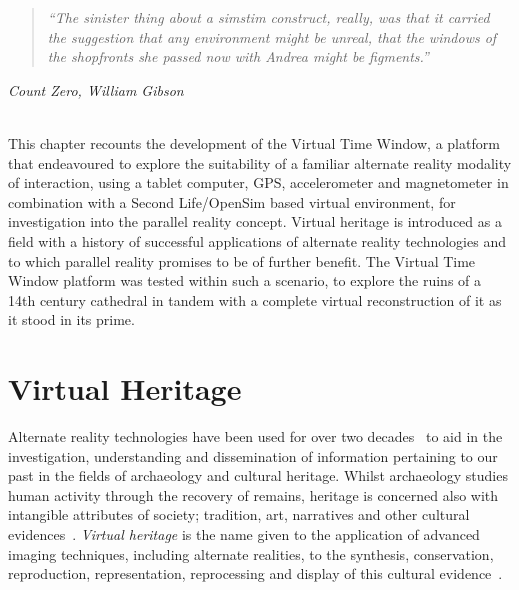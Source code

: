 \begin{quote}
	\textit{``The sinister thing about a simstim construct, really, was that it carried the suggestion that any environment might be unreal, that the windows of the shopfronts she passed now with Andrea might be figments.''}
\end{quote}
\hfill \textit{Count Zero, William Gibson}
\\
\\


\label{chapter-vtw}

This chapter recounts the development of the Virtual Time Window, a platform that endeavoured to explore the suitability of a familiar alternate reality modality of interaction, using a tablet computer, GPS, accelerometer and magnetometer in combination with a Second Life/OpenSim based virtual environment, for investigation into the parallel reality concept. Virtual heritage is introduced as a field with a history of successful applications of alternate reality technologies and to which parallel reality promises to be of further benefit. The Virtual Time Window platform was tested within such a scenario, to explore the ruins of a 14th century cathedral in tandem with a complete virtual reconstruction of it as it stood in its prime.


\section{Virtual Heritage}

Alternate reality technologies have been used for over two decades~\cite{Roussou2002} to aid in the investigation, understanding and dissemination of information pertaining to our past in the fields of archaeology and cultural heritage. Whilst archaeology studies human activity through the recovery of remains, heritage is concerned also with intangible attributes of society; tradition, art, narratives and other cultural evidences~\cite{Roussou2002}. \textit{Virtual heritage} is the name given to the application of advanced imaging techniques, including alternate realities, to the synthesis, conservation, reproduction, representation, reprocessing and display of this cultural evidence~\cite{roussou:photorealism}.

